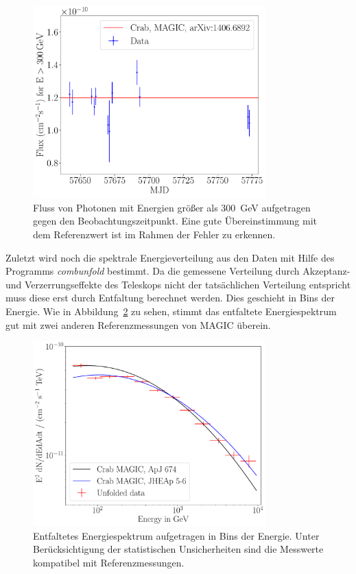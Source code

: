 \begin{figure}
  \centering
  \includegraphics[width=0.8\textwidth]{figures/flute_lichtkurve.pdf}
  \caption{Fluss von Photonen mit Energien größer als
  \SI{300}{\giga\electronvolt} aufgetragen gegen den Beobachtungszeitpunkt. Eine
  gute Übereinstimmung mit dem Referenzwert ist im Rahmen der Fehler zu
  erkennen.}
  \label{fig:lichtkurve}
\end{figure}

Zuletzt wird noch die spektrale Energieverteilung aus den Daten mit Hilfe des
Programms \textit{combunfold} bestimmt. Da die gemessene Verteilung durch
Akzeptanz- und Verzerrungseffekte des Teleskops nicht der tatsächlichen
Verteilung entspricht muss diese erst durch Entfaltung berechnet werden. Dies
geschieht in Bins der Energie. Wie in Abbildung~\ref{fig:entfaltung} zu sehen,
stimmt das entfaltete Energiespektrum gut mit zwei anderen Referenzmessungen von
MAGIC überein.

\begin{figure}
  \centering
  \includegraphics[width=0.8\textwidth]{figures/combunfold_energyspectrum.pdf}
  \caption{Entfaltetes Energiespektrum aufgetragen in Bins der Energie. Unter
  Berücksichtigung der statistischen Unsicherheiten sind die Messwerte
  kompatibel mit Referenzmessungen.}
  \label{fig:entfaltung}
\end{figure}
